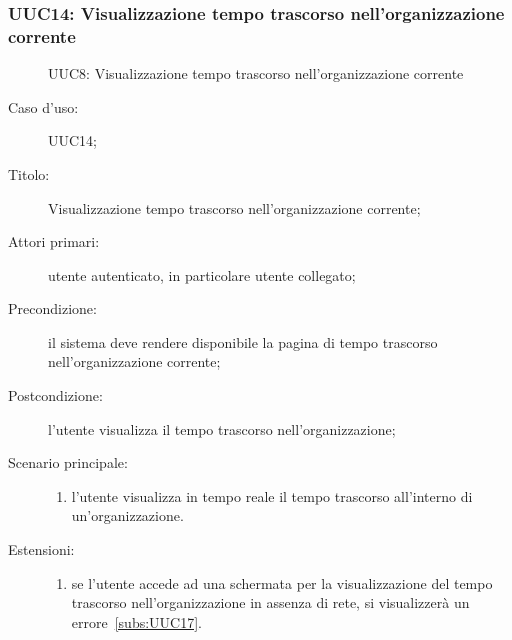\documentclass[../../../analisi-dei-requisiti.tex]{subfiles}
\begin{document}
\subsubsection{UUC14: Visualizzazione tempo trascorso nell'organizzazione corrente}%
\label{subs:UUC14}

\begin{figure}[H]
  \centering
  \caption{UUC8: Visualizzazione tempo trascorso nell'organizzazione corrente}%
  \label{fig:UUC14}
\end{figure}

\begin{description}
  \item[Caso d'uso:] UUC14;
  \item[Titolo:] Visualizzazione tempo trascorso nell'organizzazione corrente;
  \item[Attori primari:] utente autenticato, in particolare utente collegato;
  \item[Precondizione:] il sistema deve rendere disponibile la pagina di tempo trascorso nell'organizzazione corrente;
  \item[Postcondizione:] l'utente visualizza il tempo trascorso nell'organizzazione;
  \item[Scenario principale:]
        \begin{enumerate}
          \item l'utente visualizza in tempo reale il tempo trascorso all'interno di un'organizzazione.
        \end{enumerate}
  \item[Estensioni:]
        \begin{enumerate}
          \item se l'utente accede ad una schermata per la visualizzazione del tempo trascorso nell'organizzazione in assenza di rete, si visualizzerà un errore~\ref{subs:UUC17}.
        \end{enumerate}
\end{description}
\end{document}
